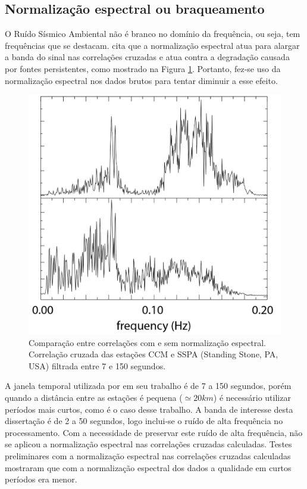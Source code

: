 \subsection{Normalização espectral ou braqueamento}

O Ruído Sísmico Ambiental não é branco no domínio da frequência, ou seja, tem frequências que se destacam. \cite{bensen_processing_2007} cita que a normalização espectral atua para alargar a banda do sinal nas correlações cruzadas e atua contra a degradação causada por fontes persistentes, como mostrado na Figura \ref{whitening}. Portanto, fez-se uso da normalização espectral nos dados brutos para tentar diminuir a esse efeito.

\begin{figure}[!ht]
\centering
\includegraphics[scale=0.5]{Figs/whitening.png}
\caption[Comparação entre correlações com e sem  normalização espectral.]{Comparação entre correlações com e sem  normalização espectral. Correlação cruzada das estações CCM e SSPA (Standing Stone, PA, USA) filtrada entre 7 e 150 segundos.}
\label{whitening}
\end{figure} 

A janela temporal  utilizada por \cite{bensen_processing_2007} em seu trabalho é de 7 a 150 segundos, porém quando a distância entre as estações é pequena ($\simeq 20 km$) é necessário utilizar períodos mais curtos, como é o caso desse trabalho. A banda de interesse desta dissertação é de 2 a 50 segundos, logo inclui-se o ruído de alta frequência no processamento. Com a necessidade de preservar este ruído de alta frequência, não se aplicou a normalização espectral nas correlações cruzadas calculadas. Testes preliminares com a normalização espectral nas correlações cruzadas calculadas mostraram que com a normalização espectral dos dados a qualidade em curtos períodos era menor. 


